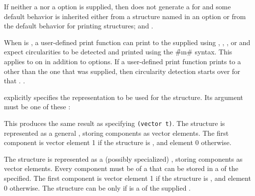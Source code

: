 If neither a  
       nor a  option 
is supplied,
then  does not generate a  
 for  and some default behavior is inherited
either from a structure named in an  option 
    or from the default behavior for printing structures;
 and \secref\PrintingStructures.

When  is ,
a user-defined print function can print  
to the supplied  using  
    ,
    ,
    , 
 or 
and expect circularities to be detected and printed using the \f{\#\i{n}\#} syntax.
This applies to  on  in addition to
 options.
If a user-defined print function prints to a  other than the one
that was supplied, then circularity detection starts over for that . 
.
 



 explicitly specifies the representation to be used for
the structure.  Its argument must be one of these :

\beginlist

This produces the same result as specifying {\tt (vector t)}.
The structure is represented
as a general , storing components as vector elements.
The first component is vector 
element 1 if the structure is , and element 0 otherwise.



The structure is represented as a (possibly specialized) , storing
components as vector elements.  Every component must be of a  
that can be stored in a  of the  specified.  
The first component is vector
element 1 if the structure is , and element 0 otherwise.
The structure can be  only if  
is a  of the supplied .

